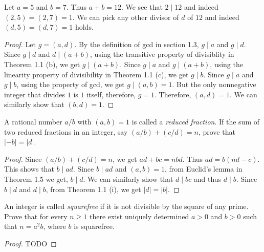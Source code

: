 \begin{example}
  Let \( a = 5 \) and \( b = 7 \). Thus \( a + b = 12 \). We see that
  \( 2 \mid 12 \) and indeed \( (2, 5) = (2, 7) = 1 \). We can pick
  any other divisor of \( d \) of \( 12 \) and indeed \( (d, 5) = (d,
  7) = 1 \) holds.
\end{example}

\begin{proof}
  Let \( g = (a, d) \). By the definition of gcd in section 1.3, \( g
  \mid a \) and \( g \mid d \). Since \( g \mid d \) and \( d \mid (a
  + b) \), using the transitive property of divisiblity in Theorem 1.1
  (b), we get \( g \mid (a + b) \). Since \( g \mid a \) and \( g \mid
  (a + b) \), using the linearity property of divisibility in Theorem
  1.1 (c), we get \( g \mid b \). Since \( g \mid a \) and \( g \mid b
  \), using the property of gcd, we get \( g \mid (a, b) = 1 \). But
  the only nonnegative integer that divides \( 1 \) is \( 1 \) itself,
  therefore, \( g = 1 \). Therefore, \( (a, d) = 1 \). We can
  similarly show that \( (b, d) = 1 \).
\end{proof}


\begin{exercise}{1.7}
  A rational number \( a/b \) with \( (a, b) = 1 \) is called a
  \emph{reduced fraction}. If the sum of two reduced fractions in an
  integer, say \( (a/b) + (c/d) = n \), prove that \( \lvert -b \rvert
  = \lvert d \rvert \).
\end{exercise}

\begin{proof}
  Since \( (a/b) + (c/d) = n \), we get \( ad + bc = nbd \). Thus \(
  ad = b(nd - c) \). This shows that \( b \mid ad \). Since \( b \mid
  ad \) and \( (a, b) = 1 \), from Euclid's lemma in Theorem 1.5 we
  get, \( b \mid d \). We can similarly show that \( d \mid bc \) and
  thus \( d \mid b \). Since \( b \mid d \) and \( d \mid b \), from
  Theorem 1.1 (i), we get \( \lvert d \rvert = \lvert b \rvert \).
\end{proof}


\begin{exercise}{1.8}
  An integer is called \emph{squarefree} if it is not divisible by the
  square of any prime. Prove that for every \( n \ge 1 \) there exist
  uniquely determined \( a > 0 \) and \( b > 0 \) such that \( n = a^2
  b \), where \( b \) is squarefree.
\end{exercise}

\begin{proof}
  TODO
\end{proof}
